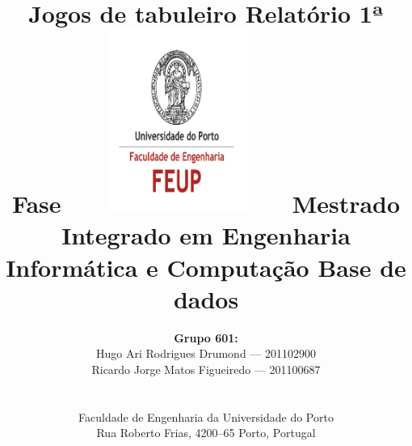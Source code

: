 \documentclass[a4paper]{article}
\begin{document}
\setlength{\textwidth}{16cm}
\setlength{\textheight}{22cm}

\title{\Huge\textbf{Jogos de tabuleiro}\linebreak\linebreak\linebreak
\Large\textbf{Relatório 1ª Fase}\linebreak\linebreak
\includegraphics[height=6cm, width=7cm]{feup.pdf}\linebreak \linebreak
\Large{Mestrado Integrado em Engenharia Informática e Computação} \linebreak \linebreak
\Large{Base de dados}\linebreak
}

\author{\textbf{Grupo 601:}\\ Hugo Ari Rodrigues Drumond --- 201102900 \\  Ricardo Jorge Matos Figueiredo --- 201100687\\\linebreak\linebreak \\
 \\ Faculdade de Engenharia da Universidade do Porto \\ Rua Roberto Frias, 4200--65 Porto, Portugal \linebreak\linebreak\linebreak
\linebreak\linebreak\vspace{1cm}}
\maketitle
\thispagestyle{empty}

\newpage
\end{document}
